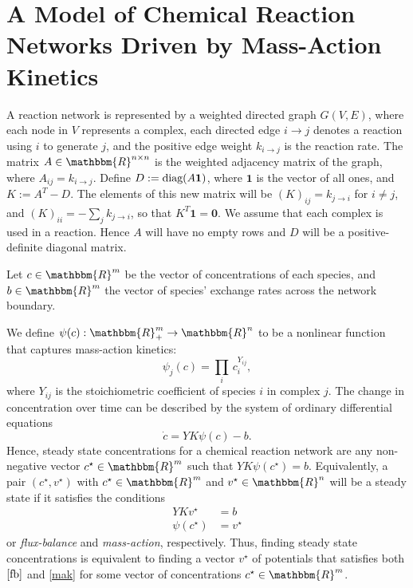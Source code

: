 \documentclass[smallextended]{svjour3}       %
\newcounter{sent}
\newcommand*{\diag}{\mbox{\rm diag}}
\newcommand*{\0}{\mathbf{0}}
\newcommand*{\1}{\mathbf{1}}
\newcommand*{\R}{\mathbbm{R}}
\begin{document}
\section{A Model of Chemical Reaction Networks Driven by Mass-Action Kinetics} 
\label{section:crnt-model}
A reaction network is represented by a weighted directed graph
$G(V,E)$, where each node in $V$ represents a complex, each directed edge
$i\rightarrow j$ denotes a reaction using $i$ to generate $j$, and the
positive edge weight $k_{i\rightarrow j}$ is the reaction rate. The matrix $A
\in \R^{n \times n}$ is the weighted adjacency matrix of the graph, where
$A_{ij}=k_{i\rightarrow j}$.  Define $D := \diag(A\1)$, where $\1$ is the
vector of all ones, and $K := A^T-D$.  The elements of this new matrix will
be $(K)_{ij} = k_{j \rightarrow i}$ for $i \neq j$, and $(K)_{ii} = -\sum_j
k_{j \rightarrow i}$, so that $K^T \1 = \0$.  We assume that each complex
is used in a reaction. Hence $A$ will have no empty rows and $D$ will 
be a positive-definite diagonal matrix.

Let $c \in \R^m$ be the vector of concentrations of each species, and $b \in
\R^m$ the vector of species' exchange rates across the network boundary.

We define $\psi(c):\R^m_+\rightarrow \R^n$ to be a nonlinear function that
captures mass-action kinetics:
\[
\psi_j(c) = \prod_i\,c_i^{Y_{ij}},
\]
where $Y_{ij}$ is the stoichiometric coefficient of species $i$ in complex $j$.
The change in concentration over time can be described by the system of
ordinary differential equations 
\[
\dot{c} = YK\psi(c) - b.
\] 
\noindent Hence, steady state concentrations for a chemical reaction network
are any non-negative vector $c^\star\in\R^m$ such that $YK\psi(c^\star)=b$.
Equivalently, a pair $(c^\star,v^\star)$ with $c^\star\in\R^m$ and
$v^\star\in\R^n$ will be a steady state if it satisfies the conditions
\begin{align} 
  YKv^\star &=b \label{fb}\tag{FB} \\ \psi(c^\star) &= v^\star
  \label{mak}\tag{MA} 
\end{align}
or \emph{flux-balance} and \emph{mass-action}, respectively. Thus, finding 
steady state concentrations is equivalent to finding a vector $v^\star$ of potentials
that satisfies both $\eqref{fb}$ and \eqref{mak} for some vector of concentrations 
$c^\star\in\R^m$.
\end{document}
